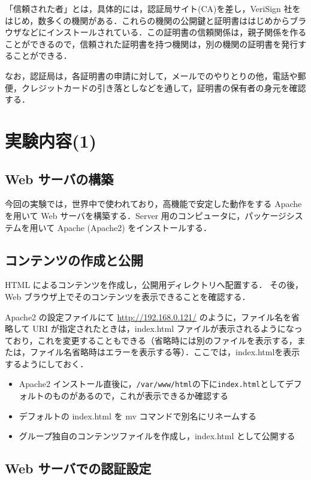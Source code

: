 「信頼された者」とは，具体的には，認証局サイト(CA)を差し，VeriSign 社を
はじめ，数多くの機関がある．これらの機関の公開鍵と証明書ははじめからブラ
ウザなどにインストールされている．この証明書の信頼関係は，親子関係を作る
ことができるので，信頼された証明書を持つ機関は，別の機関の証明書を発行す
ることができる．

なお，認証局は，各証明書の申請に対して，メールでのやりとりの他，電話や郵
便，クレジットカードの引き落としなどを通して，証明書の保有者の身元を確認
する．

\section{実験内容(1)}

\subsection*{Web サーバの構築}

今回の実験では，世界中で使われており，高機能で安定した動作をする Apache 
を用いて Web サーバを構築する．Server 用のコンピュータに，パッケージシス
テムを用いて Apache (Apache2) をインストールする．

\subsection*{コンテンツの作成と公開}

HTML によるコンテンツを作成し，公開用ディレクトリへ配置する．
その後，Web ブラウザ上でそのコンテンツを表示できることを確認する．

Apache2 の設定ファイルにて \url{http://192.168.0.121/} のように，ファイル名を省略して URI が指定されたときは，index.html ファイルが表示されるようになっており，これを変更することもできる（省略時には別のファイルを表示する，または，ファイル名省略時はエラーを表示する等）．ここでは，index.htmlを表示するようにしておく．

\begin{itemize}
 \item Apache2 インストール直後に，\texttt{/var/www/html}の下に\texttt{index.html}としてデフォルトのものがあるので，これが表示できるか確認する
 \item デフォルトの index.html を mv コマンドで別名にリネームする
 \item グループ独自のコンテンツファイルを作成し，index.html として公開する
\end{itemize}


\subsection*{Web サーバでの認証設定}

